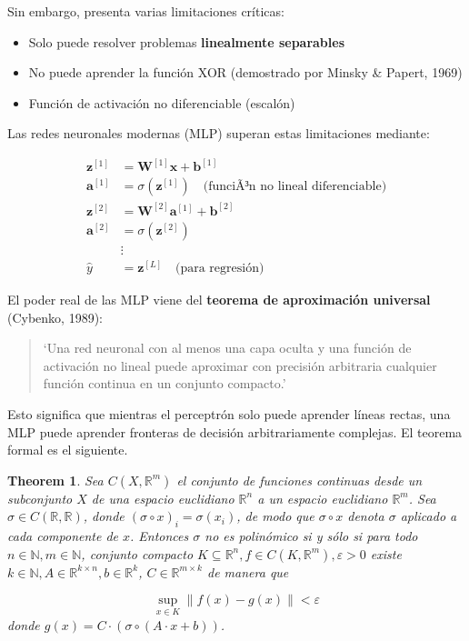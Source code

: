 \documentclass[12pt]{article}
\newtheorem {theorem} {Theorem}
\begin{document}
Sin embargo, presenta varias limitaciones críticas:

\begin{itemize}
\item Solo puede resolver problemas \textbf{linealmente separables}
\item No puede aprender la función XOR (demostrado por Minsky \& Papert, 1969)
\item Función de activación no diferenciable (escalón)
\end{itemize}

Las redes neuronales modernas (MLP) superan estas limitaciones mediante:

\begin{align}
\mathbf{z}^{[1]} &= \mathbf{W}^{[1]} \mathbf{x} + \mathbf{b}^{[1]} \\
\mathbf{a}^{[1]} &= \sigma(\mathbf{z}^{[1]}) \quad \text{(funciÃ³n no lineal diferenciable)} \\
\mathbf{z}^{[2]} &= \mathbf{W}^{[2]} \mathbf{a}^{[1]} + \mathbf{b}^{[2]} \\
\mathbf{a}^{[2]} &= \sigma(\mathbf{z}^{[2]}) \\
&\vdots \\
\hat{y} &= \mathbf{z}^{[L]} \quad \text{(para regresión)}
\end{align}


El poder real de las MLP viene del \textbf{teorema de aproximación universal} (Cybenko, 1989):

\begin{quote}
`Una red neuronal con al menos una capa oculta y una función de activación no lineal puede aproximar con precisión arbitraria cualquier función continua en un conjunto compacto.'
\end{quote}

Esto significa que mientras el perceptrón solo puede aprender líneas rectas, una MLP puede aprender fronteras de decisión arbitrariamente complejas. El teorema formal es el siguiente.

\begin{theorem}
Sea $C\left(X, \mathbb{R}^m\right)$ el conjunto de funciones continuas desde un subconjunto $X$ de una espacio euclidiano $\mathbb{R}^n$ a un espacio euclidiano $\mathbb{R}^m$. Sea $\sigma \in C(\mathbb{R}, \mathbb{R})$, donde $(\sigma \circ x)_i=\sigma\left(x_i\right)$, de modo que $\sigma \circ x$ denota $\sigma$ aplicado a cada componente de $x$. Entonces $\sigma$ no es polinómico si y sólo si para todo $n \in \mathbb{N}, m \in \mathbb{N}$, conjunto compacto $K \subseteq \mathbb{R}^n, f \in C\left(K, \mathbb{R}^m\right), \varepsilon>0$ existe $k \in \mathbb{N}, A \in \mathbb{R}^{k \times n}, b \in \mathbb{R}^k$, $C \in \mathbb{R}^{m \times k}$ de manera que

$$
\sup _{x \in K}\|f(x)-g(x)\|<\varepsilon
$$
%
donde $g(x)=C \cdot(\sigma \circ(A \cdot x+b))$.
\end{theorem}
\end{document}
